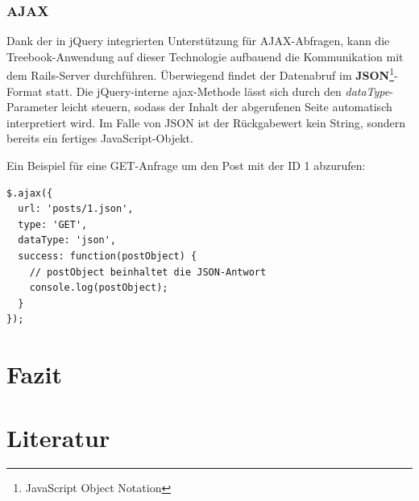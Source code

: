 \documentclass[10pt,a4paper]{book}
\begin{document}
\subsection{AJAX}
Dank der in jQuery integrierten Unterstützung für AJAX-Abfragen, kann die Treebook-Anwendung auf dieser Technologie aufbauend die Kommunikation mit dem Rails-Server durchführen.
Überwiegend findet der Datenabruf im \textbf{JSON}\footnote{JavaScript Object Notation}-Format statt. Die jQuery-interne ajax-Methode lässt sich durch den \textit{dataType}-Parameter leicht steuern, sodass der Inhalt der abgerufenen Seite automatisch interpretiert wird. Im Falle von JSON ist der Rückgabewert kein String, sondern bereits ein fertiges JavaScript-Objekt.

Ein Beispiel für eine GET-Anfrage um den Post mit der ID 1 abzurufen:
\begin{footnotesize}
\begin{verbatim}
$.ajax({
  url: 'posts/1.json',
  type: 'GET',
  dataType: 'json',
  success: function(postObject) {
    // postObject beinhaltet die JSON-Antwort
    console.log(postObject);
  }
});
\end{verbatim}
\end{footnotesize}

\chapter{Fazit}

\chapter{Literatur}
\end{document}
